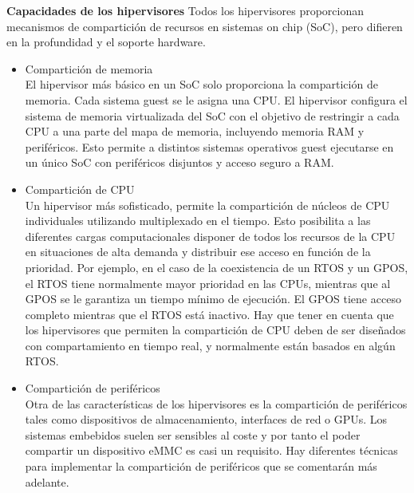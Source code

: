 \textbf{Capacidades de los hipervisores}
Todos los hipervisores proporcionan mecanismos de compartición de recursos en sistemas on chip (SoC), pero difieren en la profundidad y el soporte hardware.
\begin{itemize}
	\item Compartición de memoria\\
	El hipervisor más básico en un SoC solo proporciona la compartición de memoria. Cada sistema guest se le asigna una CPU. El hipervisor configura el sistema de memoria virtualizada del SoC con el objetivo de restringir a cada CPU a una parte del mapa de memoria, incluyendo memoria RAM y periféricos. Esto permite a distintos sistemas operativos guest ejecutarse en un único SoC con periféricos disjuntos y acceso seguro a RAM.
	\item Compartición de CPU\\
	Un hipervisor más sofisticado, permite la compartición de núcleos de CPU individuales utilizando multiplexado en el tiempo. Esto posibilita a las diferentes cargas computacionales disponer de todos los recursos de la CPU en situaciones de alta demanda y distribuir ese acceso en función de la prioridad. Por ejemplo, en el caso de la coexistencia de un RTOS y un GPOS, el RTOS tiene normalmente mayor prioridad en las CPUs, mientras que al GPOS se le garantiza un tiempo mínimo de ejecución. El GPOS tiene acceso completo mientras que el RTOS está inactivo. Hay que tener en cuenta que los hipervisores que permiten la compartición de CPU deben de ser diseñados con compartamiento en tiempo real, y normalmente están basados en algún RTOS.
	\item Compartición de periféricos\\
	Otra de las características de los hipervisores es la compartición de periféricos tales como dispositivos de almacenamiento, interfaces de red o GPUs. Los sistemas embebidos suelen ser sensibles al coste y por tanto el poder compartir un dispositivo eMMC es casi un requisito. Hay diferentes técnicas para implementar la compartición de periféricos que se comentarán más adelante.
\end{itemize}

